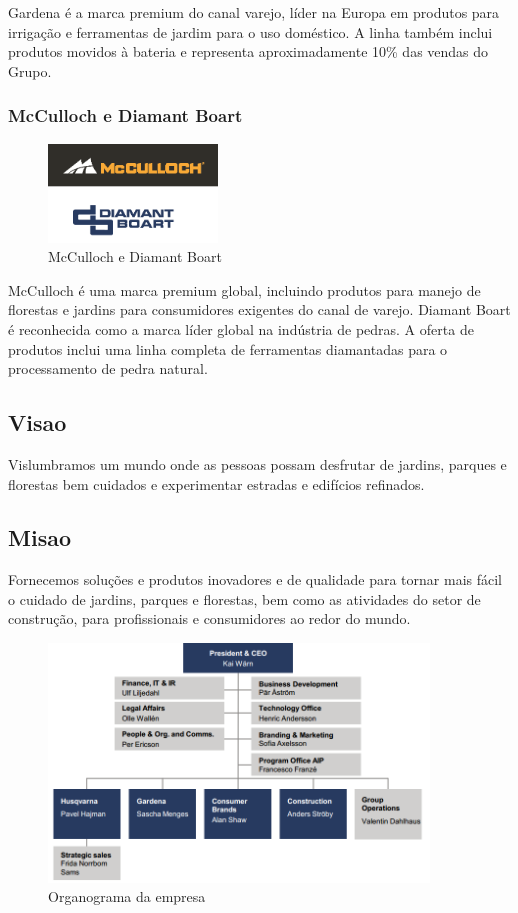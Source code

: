 \documentclass[12pt]{article}
\begin{document}
	Gardena é a marca premium do canal varejo, líder na Europa em produtos para irrigação e ferramentas de jardim para o uso doméstico. A linha também inclui produtos movidos à bateria e representa aproximadamente 10\% das vendas do Grupo.

\subsubsection{McCulloch e Diamant Boart}

\begin{figure}[h!]
	\centering
	\includegraphics[width=0.4\textwidth]{img/logo-mcdb.png}
	\caption{McCulloch e Diamant Boart}
\end{figure}

	McCulloch é uma marca premium global, incluindo produtos para manejo de florestas e jardins para consumidores exigentes do canal de varejo. 
	Diamant Boart é reconhecida como a marca líder global na indústria de pedras. A oferta de produtos inclui uma linha completa de ferramentas diamantadas para o processamento de pedra natural.	

\subsection{Visao}
	Vislumbramos um mundo onde as pessoas possam desfrutar de jardins, parques e florestas bem cuidados e experimentar estradas e edifícios refinados.

\subsection{Misao}
	Fornecemos soluções e produtos inovadores e de qualidade para tornar mais fácil o cuidado de jardins, parques e florestas, bem como as atividades do setor de construção, para profissionais e consumidores ao redor do mundo.

\begin{figure}[h!]
	\centering
	\includegraphics[width=0.9\textwidth]{img/organograma.png}
	\caption{Organograma da empresa}
	\label{organograma}
\end{figure}
\end{document}
